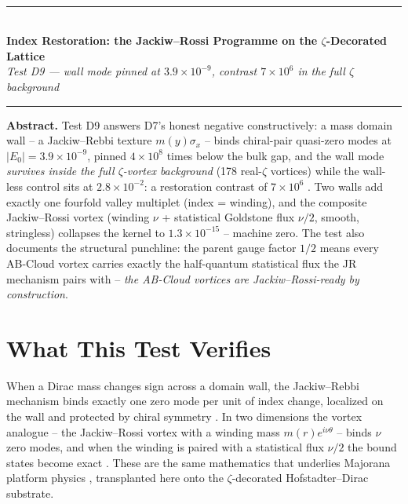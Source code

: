 \documentclass[11pt,a4paper]{article}
\begin{document}
\\[0.3em]
\rule{\textwidth}{0.8pt}\\[0.6em]
{\LARGE\bfseries\color{labblue} Index Restoration: the Jackiw--Rossi Programme on the $\zeta$-Decorated Lattice}\\[0.5em]
{\normalsize\itshape Test D9 — wall mode pinned at $3.9\times10^{-9}$, contrast $7\times10^6$ in the full $\zeta$ background}\\[0.4em]
\rule{\textwidth}{0.4pt}

\begin{tcolorbox}[colback=labgreen!8, colframe=labgreen!70!black, title={Verdict: PASS — 10/10 checks}, fonttitle=\bfseries, boxrule=0.6pt]
\textbf{Abstract.} Test D9 answers D7's honest negative constructively: a mass domain wall -- a Jackiw--Rebbi texture $m(y)\sigma_x$ -- binds chiral-pair quasi-zero modes at $|E_0| = 3.9\times10^{-9}$, pinned $4\times10^{8}$ times below the bulk gap, and the wall mode \emph{survives inside the full $\zeta$-vortex background} (178 real-$\zeta$ vortices) while the wall-less control sits at $2.8\times10^{-2}$: a restoration contrast of $7\times10^6$ \cite{jackiwrebbi,jackiwrossi}. Two walls add exactly one fourfold valley multiplet (index = winding), and the composite Jackiw--Rossi vortex (winding $\nu$ + statistical Goldstone flux $\nu/2$, smooth, stringless) collapses the kernel to $1.3\times10^{-15}$ -- machine zero. The test also documents the structural punchline: the parent gauge factor $1/2$ means every AB-Cloud vortex carries exactly the half-quantum statistical flux the JR mechanism pairs with -- \emph{the AB-Cloud vortices are Jackiw--Rossi-ready by construction}.
\end{tcolorbox}

\section{What This Test Verifies}
When a Dirac mass changes sign across a domain wall, the Jackiw--Rebbi mechanism binds exactly one zero mode per unit of index change, localized on the wall and protected by chiral symmetry \cite{jackiwrebbi}. In two dimensions the vortex analogue -- the Jackiw--Rossi vortex with a winding mass $m(r)e^{i\nu\theta}$ -- binds $\nu$ zero modes, and when the winding is paired with a statistical flux $\nu/2$ the bound states become exact \cite{jackiwrossi,readgreen}. These are the same mathematics that underlies Majorana platform physics \cite{kitaev}, transplanted here onto the $\zeta$-decorated Hofstadter--Dirac substrate.
\end{document}
